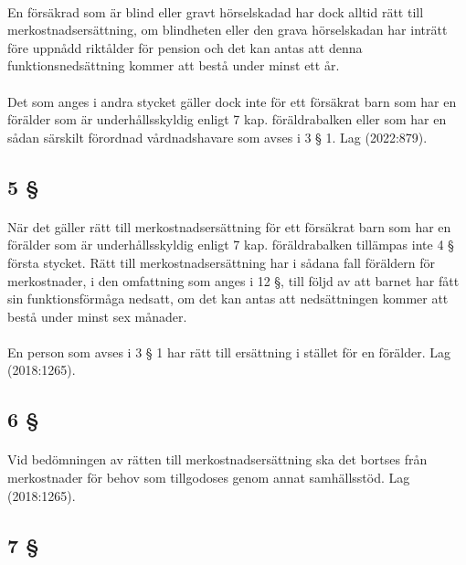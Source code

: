 \documentclass[a4paper,notitlepage,openany,10pt]{book}
\begin{document}
\paragraph*{}
En försäkrad som är blind eller gravt hörselskadad har dock alltid rätt till merkostnadsersättning, om blindheten eller den grava hörselskadan har inträtt före uppnådd riktålder för pension och det kan antas att denna funktionsnedsättning kommer att bestå under minst ett år.
\paragraph*{}
Det som anges i andra stycket gäller dock inte för ett försäkrat barn som har en förälder som är underhållsskyldig enligt 7 kap. föräldrabalken eller som har en sådan särskilt förordnad vårdnadshavare som avses i 3 § 1.
Lag (2022:879).
\subsection*{5 §}
\paragraph*{}
När det gäller rätt till merkostnadsersättning för ett försäkrat barn som har en förälder som är underhållsskyldig enligt 7 kap. föräldrabalken tillämpas inte 4 § första stycket. Rätt till merkostnadsersättning har i sådana fall föräldern för merkostnader, i den omfattning som anges i 12 §, till följd av att barnet har fått sin funktionsförmåga nedsatt, om det kan antas att nedsättningen kommer att bestå under minst sex månader.
\paragraph*{}
En person som avses i 3 § 1 har rätt till ersättning i stället för en förälder.
Lag (2018:1265).
\subsection*{6 §}
\paragraph*{}
Vid bedömningen av rätten till merkostnadsersättning ska det bortses från merkostnader för behov som tillgodoses genom annat samhällsstöd.
Lag (2018:1265).
\subsection*{7 §}
\end{document}
